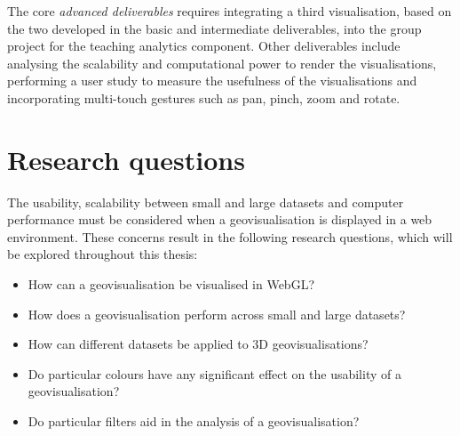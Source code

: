 {	The core \emph{advanced deliverables} requires integrating a third visualisation, based on the two developed in the basic and intermediate deliverables, into the group project for the teaching analytics component. Other deliverables include analysing the scalability and computational power to render the visualisations, performing a user study to measure the usefulness of the visualisations and incorporating multi-touch gestures such as pan, pinch, zoom and rotate.
	
}

\section{Research questions} {
\label{sec:research_questions}


	The usability, scalability between small and large datasets and computer performance must be considered when a geovisualisation is displayed in a web environment. These concerns result in the following research questions, which will be explored throughout this thesis:

	\begin{itemize}
		\item How can a geovisualisation be visualised in WebGL?
		\item How does a geovisualisation perform across small and large datasets?
		\item How can different datasets be applied to 3D geovisualisations?
		\item Do particular colours have any significant effect on the usability of a geovisualisation?
		\item Do particular filters aid in the analysis of a geovisualisation?
	\end{itemize}

}
